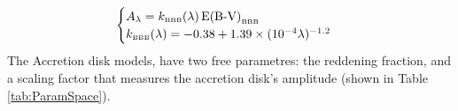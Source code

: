 \begin{equation}
     \begin{cases}   
     A_\lambda = k_{\mbox{\tiny{BBB}}}(\lambda) \, \mbox{E(B-V)}_{\mbox{\tiny{BBB}}} \\ 
     k_{\mbox{\tiny{BBB}}}(\lambda)  = -0.38+1.39\times(10^{-4} \lambda)^{-1.2}\end{cases}
\end{equation}
The Accretion disk models, have two free parametres: the reddening fraction, and a scaling factor that measures the accretion disk's amplitude (shown in Table \ref{tab:ParamSpace}).

